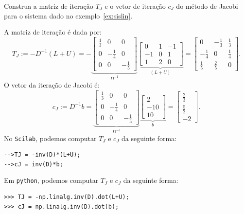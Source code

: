 \begin{ex}
  Construa a matriz de iteração $T_J$ e o vetor de iteração $c_J$ do método de Jacobi para o sistema dado no exemplo~\ref{ex:sislin}. 
\end{ex}
\begin{sol}
  A matriz de iteração é dada por:
  \begin{equation*}
    T_J := -D^{-1}(L + U) = -
    \underbrace{\begin{bmatrix}
      \frac{1}{3} & 0 & 0\\
      0 & -\frac{1}{4} & 0\\
      0 & 0 & -\frac{1}{5}
    \end{bmatrix}}_{D^{-1}}
  \underbrace{\begin{bmatrix}
    0 & 1 & -1\\
    -1 & 0 & 1\\
    1 & 2 & 0
  \end{bmatrix}}_{(L + U)} =
\begin{bmatrix}
  0 & -\frac{1}{3} & \frac{1}{3}\\
  -\frac{1}{4} & 0 & \frac{1}{4}\\
  \frac{1}{5} & \frac{2}{5} & 0
\end{bmatrix}.
  \end{equation*}
O vetor da iteração de Jacobi é:
\begin{equation*}
  c_J := D^{-1}b = 
    \underbrace{\begin{bmatrix}
      \frac{1}{3} & 0 & 0\\
      0 & -\frac{1}{4} & 0\\
      0 & 0 & -\frac{1}{5}
    \end{bmatrix}}_{D^{-1}}
    \underbrace{\begin{bmatrix}
      2\\
      -10\\
      10
    \end{bmatrix}}_{b} = 
    \begin{bmatrix}
      \frac{2}{3}\\
      \frac{5}{2}\\
      -2
    \end{bmatrix}.
\end{equation*}
\ifisscilab
No \verb+Scilab+, podemos computar $T_J$ e $c_J$ da seguinte forma:
\begin{verbatim}
-->TJ = -inv(D)*(L+U);
-->cJ = inv(D)*b;
\end{verbatim}
\fi
\ifispython
Em \verb+python+, podemos computar $T_J$ e $c_J$ da seguinte forma:
\begin{verbatim}
>>> TJ = -np.linalg.inv(D).dot(L+U);
>>> cJ = np.linalg.inv(D).dot(b);
\end{verbatim}
\fi
\end{sol}

